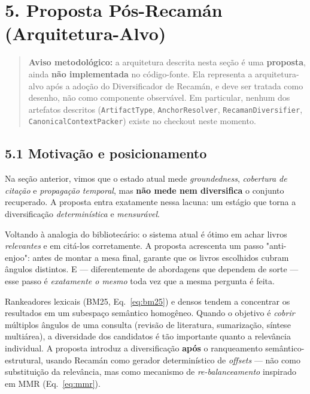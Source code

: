 
\section*{5. Proposta Pós-Recamán (Arquitetura-Alvo)}

\begin{quote}
\textbf{Aviso metodológico:} a arquitetura descrita nesta seção é uma
\textbf{proposta}, ainda \textbf{não implementada} no código-fonte. Ela representa
a arquitetura-alvo após a adoção do Diversificador de Recamán, e deve ser tratada
como desenho, não como componente observável. Em particular, nenhum dos artefatos
descritos (\texttt{ArtifactType}, \texttt{AnchorResolver},
\texttt{RecamanDiversifier}, \texttt{CanonicalContextPacker}) existe no checkout
neste momento.
\end{quote}

\subsection*{5.1 Motivação e posicionamento}

 Na seção anterior, vimos que o estado atual mede \emph{groundedness},
\emph{cobertura de citação} e \emph{propagação temporal}, mas \textbf{não mede nem
diversifica} o conjunto recuperado. A proposta entra exatamente nessa lacuna: um
estágio que torna a diversificação \emph{determinística} e \emph{mensurável}.

\begin{intuicao}
Voltando à analogia do bibliotecário: o sistema atual é ótimo em achar livros
\emph{relevantes} e em citá-los corretamente. A proposta acrescenta um passo
"anti-enjoo": antes de montar a mesa final, garante que os livros escolhidos
cubram ângulos distintos. E --- diferentemente de abordagens que dependem de sorte
--- esse passo é \emph{exatamente o mesmo} toda vez que a mesma pergunta é feita.
\end{intuicao}

 Rankeadores lexicais (BM25, Eq.~\ref{eq:bm25}) e densos tendem a
concentrar os resultados em um subespaço semântico homogêneo. Quando o objetivo é
\emph{cobrir} múltiplos ângulos de uma consulta (revisão de literatura,
sumarização, síntese multiárea), a diversidade dos candidatos é tão importante
quanto a relevância individual. A proposta introduz a diversificação
\textbf{após} o ranqueamento semântico-estrutural, usando Recamán como gerador
determinístico de \emph{offsets} --- não como substituição da relevância, mas como
mecanismo de \emph{re-balanceamento} inspirado em MMR (Eq.~\ref{eq:mmr}).

